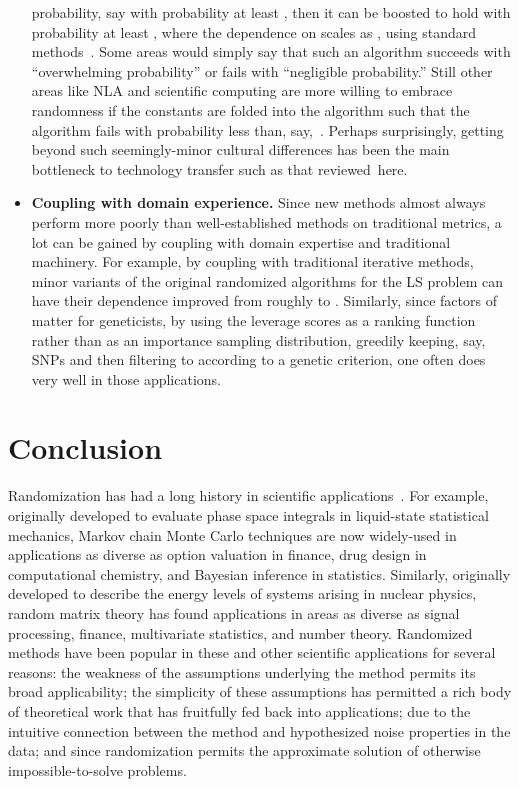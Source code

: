 \documentclass[twoside]{article}
\begin{document}
\begin{itemize}
probability, say with probability at least , then it can be boosted 
to hold with probability at least , where the dependence on 
 scales as , using standard 
methods~\cite{MotwaniRaghavan95}.
Some areas would simply say that such an algorithm succeeds with 
``overwhelming probability'' or fails with ``negligible probability.''
Still other areas like NLA and scientific computing are more willing to 
embrace randomness if the constants are folded into the algorithm such that 
the algorithm fails with probability less than, say,~.
Perhaps surprisingly, getting beyond such seemingly-minor cultural 
differences has been the main bottleneck to technology transfer such as that 
reviewed~here.
\item
\textbf{Coupling with domain experience.}
Since new methods almost always perform more poorly than well-established 
methods on traditional metrics, a lot can be gained by coupling with domain
expertise and traditional machinery.
For example, by coupling with traditional iterative methods, minor variants 
of the original randomized algorithms for the LS problem can have their 
 dependence improved from roughly  to 
.
Similarly, since factors of  matter for geneticists, by using the 
leverage scores as a ranking function rather than as an importance sampling 
distribution, greedily keeping, say,  SNPs and then filtering to  
according to a genetic criterion, one often does very well in those 
applications.
\end{itemize}


\section{Conclusion}
\label{sxn:conclusion}

Randomization has had a long history in scientific 
applications~\cite{HamHan64,Met53}.
For example, originally developed to evaluate phase space integrals in 
liquid-state statistical mechanics, Markov chain Monte Carlo techniques 
are now widely-used in applications as diverse as option valuation in 
finance, drug design in computational chemistry, and Bayesian inference
in statistics.
Similarly, originally developed to describe the energy levels of systems
arising in nuclear physics, random matrix theory has found applications 
in areas as diverse as signal processing, finance, multivariate 
statistics,  and number theory. 
Randomized methods have been popular in these and other scientific 
applications for several reasons:
the weakness of the assumptions underlying the method permits its broad 
applicability; 
the simplicity of these assumptions has permitted a rich body of 
theoretical work that has fruitfully fed back into applications; 
due to the intuitive connection between the method and hypothesized noise 
properties in the data; and
since randomization permits the approximate solution of otherwise
impossible-to-solve problems.
\end{document}
